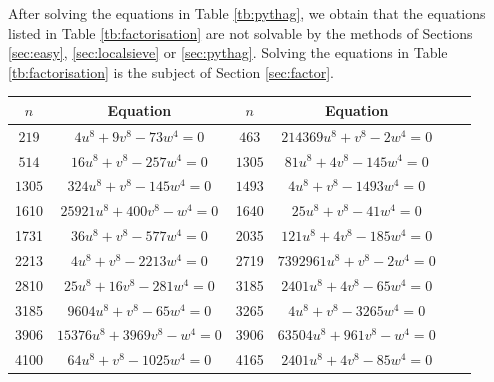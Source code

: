 \documentclass[a4paper,12pt,english,reqno]{amsart}
\begin{document}
After solving the equations in Table \ref{tb:pythag}, we obtain that the equations listed in Table \ref{tb:factorisation} are not solvable by the methods of Sections \ref{sec:easy}, \ref{sec:localsieve} or \ref{sec:pythag}. Solving the equations in Table \ref{tb:factorisation} is the subject of Section \ref{sec:factor}.
\begin{table}
\begin{center}
\begin{tabular}{|c|c||c|c|c|c|}
	\hline
	$n$  & Equation & $n$  & Equation  \\\hline \hline
    $219$ & $4u^8 + 9v^8 - 73w^4=0$ &
    $463$ & $214369 u^8 + v^8 - 2 w^4=0$ \\\hline
   $514$ & $16u^8+v^8-257w^4=0$ &
$1305$ & $81 u^8 + 4 v^8 - 145  w^4=0$ \\\hline
$1305$ & $324 u^8 + v^8 - 145  w^4=0$  &
$1493$ & $4 u^8 + v^8 - 1493  w^4=0$ \\\hline
 1610 & $25921 u^8 + 400 v^8 -  w^4=0$ &
1640 & $25 u^8 + v^8 - 41  w^4=0$ \\\hline
 1731 & $36 u^8 + v^8 - 577  w^4=0$ &
 2035 & $121 u^8 + 4 v^8 - 185  w^4=0$ \\\hline
2213 & $4 u^8+v^8 -2213  w^4=0$  &
 2719 & $7392961 u^8 + v^8 - 2  w^4=0$ \\\hline
 2810 & $ 25 u^8 + 16 v^8 - 281  w^4=0$ &
 3185 & $2401 u^8 + 4 v^8 - 65  w^4=0$ \\\hline
 3185 & $9604 u^8 + v^8 - 65  w^4=0$ &
 3265 & $4 u^8 + v^8 - 3265  w^4=0$ \\\hline
3906 & $15376 u^8 + 3969 v^8 -  w^4=0$ &
3906 & $63504 u^8 + 961 v^8 -  w^4=0$  \\\hline
 4100 & $64 u^8 + v^8 - 1025  w^4=0 $ & 
4165 & $2401 u^8 + 4 v^8 - 85  w^4=0$  \\\hline

\end{tabular}
\end{center}
\end{table}
\end{document}
